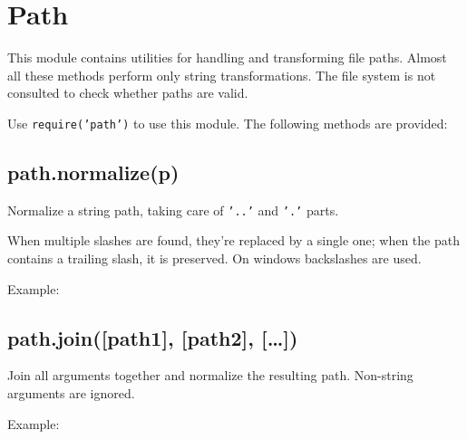 \section{Path}

\begin{Shaded}
\begin{Highlighting}[]
\NormalTok{: } 
\end{Highlighting}
\end{Shaded}

This module contains utilities for handling and transforming file paths.
Almost all these methods perform only string transformations. The file
system is not consulted to check whether paths are valid.

Use \texttt{require('path')} to use this module. The following methods
are provided:

\subsection{path.normalize(p)}

Normalize a string path, taking care of \texttt{'..'} and \texttt{'.'}
parts.

When multiple slashes are found, they're replaced by a single one; when
the path contains a trailing slash, it is preserved. On windows
backslashes are used.

Example:

\begin{Shaded}
\begin{Highlighting}[]
\NormalTok{(}\NormalTok{)}
\end{Highlighting}
\end{Shaded}

\subsection{path.join({[}path1{]}, {[}path2{]}, {[}\ldots{}{]})}

Join all arguments together and normalize the resulting path. Non-string
arguments are ignored.

Example:

\begin{Shaded}
\begin{Highlighting}[]
\NormalTok{(}\NormalTok{, }\NormalTok{, }\NormalTok{, }\NormalTok{, }\NormalTok{)}

\NormalTok{(}\NormalTok{, \{\}, }\NormalTok{)}
\end{Highlighting}
\end{Shaded}

